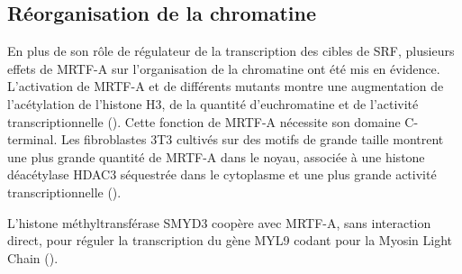 \documentclass{report}
\begin{document}
\subsection{Réorganisation de la chromatine}

En plus de son rôle de régulateur de la transcription des cibles de SRF, plusieurs effets de MRTF-A sur l'organisation de la chromatine ont été mis en évidence. L'activation de MRTF-A et de différents mutants montre une augmentation de l'acétylation de l'histone H3, de la quantité d'euchromatine et de l'activité transcriptionnelle (\cite{flouriot_actin/mkl1_2014}). Cette fonction de MRTF-A nécessite son domaine C-terminal. 
Les fibroblastes 3T3 cultivés sur des motifs de grande taille montrent une plus grande quantité de MRTF-A dans le noyau, associée à une histone déacétylase HDAC3 séquestrée dans le cytoplasme et une plus grande activité transcriptionnelle (\cite{jain_cell_2013}). 

L'histone méthyltransférase SMYD3 coopère avec MRTF-A, sans interaction direct, pour réguler la transcription du gène MYL9 codant pour la Myosin Light Chain (\cite{luo_histone_2014}). 


\newpage

\printbibliography
\end{document}
